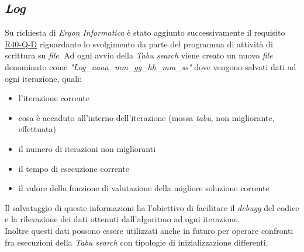 \subsection{\textit{Log}}
\label{sec:log}
\noindent Su richiesta di \textit{Ergon Informatica} è stato aggiunto successivamente il requisito \hyperref[tab:requisiti-qualitativi]{R40-Q-D}
riguardante lo svolgimento da parte del programma di attività di scrittura
su \textit{file}. Ad ogni avvio della \textit{Tabu search} viene creato un nuovo
\textit{file} denominato come \textit{"Log\_aaaa\_mm\_gg\_hh\_mm\_ss"}
dove vengono salvati dati ad ogni iterazione, quali:
\begin{itemize}
    \item l'iterazione corrente
    \item cosa è accaduto all'interno dell'iterazione (mossa \textit{tabu}, non migliorante, effettuata)
    \item il numero di iterazioni non miglioranti
    \item il tempo di esecuzione corrente
    \item il valore della funzione di valutazione della migliore soluzione corrente
\end{itemize}
Il salvataggio di queste informazioni ha
l’obiettivo di facilitare il \textit{\gls{debugg}}
del codice e la rilevazione dei dati ottenuti
dall’algoritmo ad ogni iterazione.\\
Inoltre questi dati possono essere utilizzati anche in futuro
per operare confronti fra esecuzioni della \textit{Tabu search} con
tipologie di inizializzazione differenti.

\newpage

